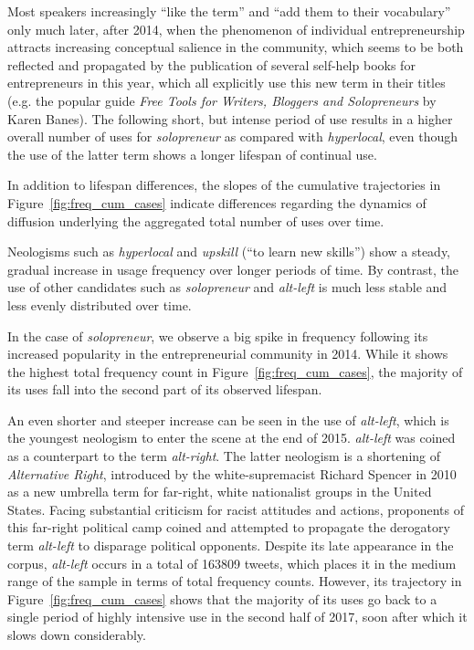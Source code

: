 \documentclass[
  a4paper,
  abstract=on,
  captions=tableabove,
  ]{scrartcl}
\newcommand{\ol}[1]{\emph{#1}}
\begin{document}
      Most speakers increasingly \enquote{like the term} and \enquote{add them to their vocabulary} only much later, after 2014, when the phenomenon of individual entrepreneurship attracts increasing conceptual salience in the community, which seems to be both reflected and propagated by the publication of several self-help books for entrepreneurs in this year, which all explicitly use this new term in their titles (e.g. the popular guide \emph{Free Tools for Writers, Bloggers and Solopreneurs} by Karen Banes). The following short, but intense period of use results in a higher overall number of uses for \ol{solopreneur} as compared with \ol{hyperlocal}, even though the use of the latter term shows a longer lifespan of continual use.

      In addition to lifespan differences, the slopes of the cumulative trajectories in Figure~\ref{fig:freq_cum_cases} indicate differences regarding the dynamics of diffusion underlying the aggregated total number of uses over time.

      Neologisms such as \ol{hyperlocal} and \ol{upskill} (\enquote{to learn new skills}) show a steady, gradual increase in usage frequency over longer periods of time. By contrast, the use of other candidates such as \ol{solopreneur} and \ol{alt-left} is much less stable and less evenly distributed over time.

      In the case of \ol{solopreneur}, we observe a big spike in frequency following its increased popularity in the entrepreneurial community in 2014. While it shows the highest total frequency count in Figure~\ref{fig:freq_cum_cases}, the majority of its uses fall into the second part of its observed lifespan.

      An even shorter and steeper increase can be seen in the use of \ol{alt-left}, which is the youngest neologism to enter the scene at the end of 2015. \ol{alt-left} was coined as a counterpart to the term \ol{alt-right}. The latter neologism is a shortening of \ol{Alternative Right}, introduced by the white-supremacist Richard Spencer in 2010 as a new umbrella term for far-right, white nationalist groups in the United States. Facing substantial criticism for racist attitudes and actions, proponents of this far-right political camp coined and attempted to propagate the derogatory term \ol{alt-left} to disparage political opponents. Despite its late appearance in the corpus, \ol{alt-left} occurs in a total of \num{163809} tweets, which places it in the medium range of the sample in terms of total frequency counts. However, its trajectory in Figure~\ref{fig:freq_cum_cases} shows that the majority of its uses go back to a single period of highly intensive use in the second half of 2017, soon after which it slows down considerably.\todo{\ol{poppygate} missing}
\end{document}
